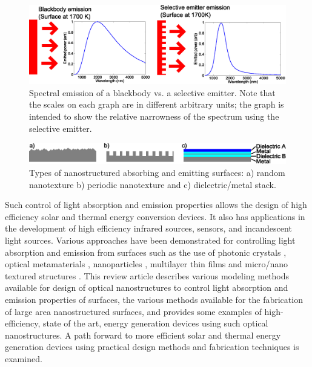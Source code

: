 \documentclass[10pt,letterpaper]{article}
\begin{document}
\begin{figure}[ht]
	\includegraphics[width=1\textwidth]{gfig_bbs}
	\caption{\label{gfig_bbs} Spectral emission of a blackbody vs. a selective emitter.  Note that the scales on each graph are in different arbitrary units; the graph is intended to show the relative narrowness of the spectrum using the selective emitter.}
\end{figure}

\begin{figure}[ht]
	\includegraphics[width=1\textwidth]{gfig_surfs}
	\caption{\label{gfig_surfs} Types of nanostructured absorbing and 
emitting surfaces: a) random nanotexture b) periodic nanotexture and c) dielectric/metal stack.} 
\end{figure}

Such control of light absorption and emission properties allows the design of high efficiency solar and thermal energy conversion devices. It also has applications in the development of 
high efficiency infrared sources, sensors, and incandescent light sources. 
Various approaches have been demonstrated for controlling light absorption and emission 
from surfaces such as the use of photonic crystals \cite{g11,NYL_SEMSC_2014,g13,g14}, 
optical metamaterials \cite{g15,g16,g17}, nanoparticles \cite{g18,g19,g20,g21}, 
multilayer thin films \cite{g22,RF_OptExp_2009} and micro/nano textured 
structures \cite{g25,g26,g27,g28}.  This review article describes various modeling methods 
available for design of optical nanostructures to control light absorption and emission properties of surfaces, the various methods available for the fabrication of large area nanostructured surfaces, and provides some examples of high-efficiency, state of the art, energy generation devices using such optical nanostructures.  A path forward to more efficient solar and thermal energy generation devices using practical design methods and fabrication techniques is examined.
\end{document}
